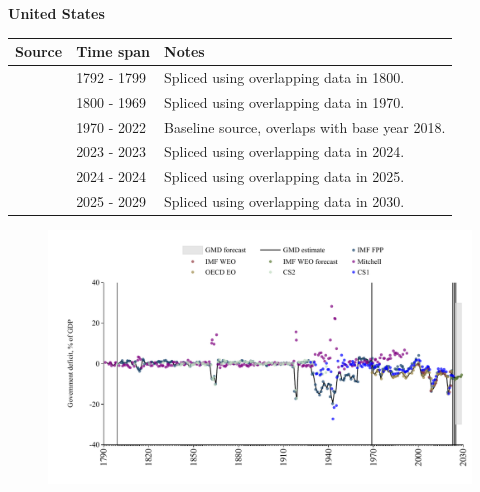 \documentclass[12pt,a4paper,landscape]{article}
\begin{document}
\begin{adjustbox}{max totalsize={\paperwidth}{\paperheight},center}
\begin{minipage}[t][\textheight][t]{\textwidth}
\vspace*{0.5cm}
{}
\begin{center}
{\Large\bfseries United States}
\end{center}
\vspace{0.5cm}
\begin{table}[H]
\centering
\small
\begin{tabular}{|l|l|l|}
\hline
\textbf{Source} & \textbf{Time span} & \textbf{Notes} \\
\hline
\rowcolor{white}\cite{Mitchell}& 1792 - 1799 &Spliced using overlapping data in 1800.\\
\rowcolor{lightgray}\cite{IMF_FPP}& 1800 - 1969 &Spliced using overlapping data in 1970.\\
\rowcolor{white}\cite{OECD_EO}& 1970 - 2022 &Baseline source, overlaps with base year 2018.\\
\rowcolor{lightgray}\cite{IMF_FPP}& 2023 - 2023 &Spliced using overlapping data in 2024.\\
\rowcolor{white}\cite{CS1_USA}& 2024 - 2024 &Spliced using overlapping data in 2025.\\
\rowcolor{lightgray}\cite{IMF_WEO_forecast}& 2025 - 2029 &Spliced using overlapping data in 2030.\\
\hline
\end{tabular}
\end{table}
\begin{figure}[H]
\centering
\includegraphics[width=\textwidth,height=0.6\textheight,keepaspectratio]{graphs/USA_govdef_GDP.pdf}
\end{figure}
\end{minipage}
\end{adjustbox}
\end{document}
